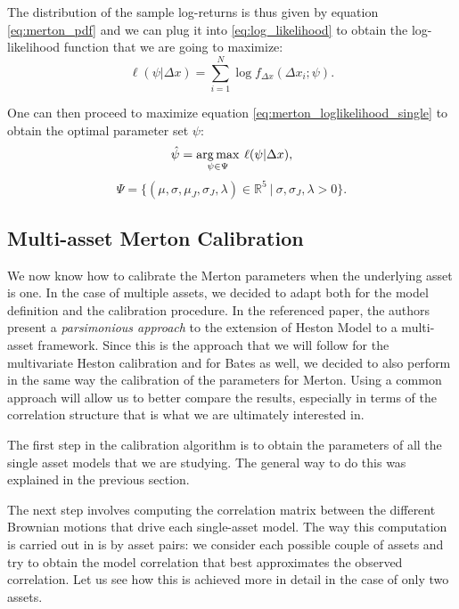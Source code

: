 The distribution of the sample log-returns is thus given by equation \eqref{eq:merton_pdf} and we can plug it into \eqref{eq:log_likelihood} to obtain the log-likelihood function that we are going to maximize:
\begin{equation}
\label{eq:merton_loglikelihood_single}
	\ell(\psi |  \Delta x) = \sum_{i=1}^{N} \log f_{ \Delta x}(\Delta x_{i}; \psi).
\end{equation}

One can then proceed to maximize equation \eqref{eq:merton_loglikelihood_single} to obtain the optimal parameter set $\psi$:
\begin{equation}
\hat{\psi} = \operatorname*{arg\,max}_{\psi \in \Psi} \:\ell(\psi |  \Delta x),
\end{equation}
\begin{equation}
\Psi = \{ (\mu, \sigma, \mu_J, \sigma_J, \lambda) \in \mathbb{R}^5 \: |\: \sigma,\sigma_J, \lambda >0\}.
\end{equation}

\subsection{Multi-asset Merton Calibration}
\label{subsec:multi_merton_cal}

We now know  how to calibrate the Merton parameters when the underlying asset is one.
In the case of multiple assets, we decided to adapt \citep{PARSIMONIOUS2011} both for the model definition and the calibration procedure.
In the referenced paper, the authors present a \textit{parsimonious approach} to the extension of Heston Model to a multi-asset framework. Since this is the approach that we will follow for the multivariate Heston calibration and for Bates as well, we decided to also perform in the same way the calibration of the parameters for Merton.
Using a common approach will allow us to better compare the results, especially in terms of the correlation structure that is what we are ultimately interested in.

The first step in the calibration algorithm is to obtain the parameters of all the single asset models that we are studying. The general way to do this was explained in the previous section. 

The next step involves computing the correlation matrix between the different Brownian motions that drive each single-asset model. 
The way this computation is carried out in \citep{PARSIMONIOUS2011} is by asset pairs: we consider each possible couple of assets and try to obtain the model correlation that best approximates the observed correlation.
Let us see how this is achieved more in detail in the case of only two assets.

